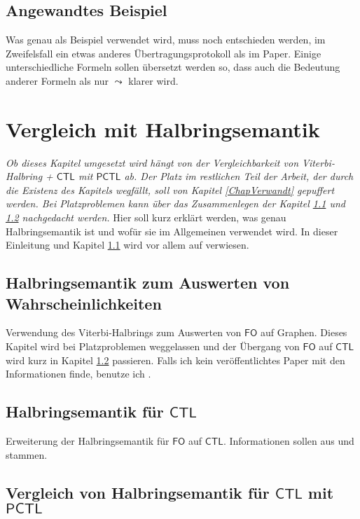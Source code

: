 \documentclass{lni}
\theoremstyle{def_style}
\theoremstyle{break}
\newcommand{\CTL}{\mathsf{CTL}}
\newcommand{\PCTL}{\mathsf{PCTL}}
\begin{document}
\subsection{Angewandtes Beispiel}

Was genau als Beispiel verwendet wird, muss noch entschieden werden, im Zweifelsfall ein etwas anderes Übertragungsprotokoll als im Paper.
Einige unterschiedliche Formeln sollen übersetzt werden so, dass auch die Bedeutung anderer Formeln als nur $\leadsto$ klarer wird.

\section{Vergleich mit Halbringsemantik}

\emph{Ob dieses Kapitel umgesetzt wird hängt von der Vergleichbarkeit von Viterbi-Halbring + $\CTL$ mit $\PCTL$ ab. Der Platz im restlichen Teil der Arbeit, der durch die Existenz des Kapitels wegfällt, soll von Kapitel \ref{ChapVerwandt} gepuffert werden. Bei Platzproblemen kann über das Zusammenlegen der Kapitel \ref{HalbringFO} und \ref{HalbringCTL} nachgedacht werden.}
Hier soll kurz erklärt werden, was genau Halbringsemantik ist und wofür sie im Allgemeinen verwendet wird. In dieser Einleitung und Kapitel \ref{HalbringFO} wird vor allem auf \cite{gradel2017semiring} verwiesen.

\subsection{Halbringsemantik zum Auswerten von Wahrscheinlichkeiten}
\label{HalbringFO}

Verwendung des Viterbi-Halbrings zum Auswerten von $\mathsf{FO}$ auf Graphen. Dieses Kapitel wird bei Platzproblemen weggelassen und der Übergang von $\mathsf{FO}$ auf $\mathsf{CTL}$ wird kurz in Kapitel \ref{HalbringCTL} passieren. Falls ich kein veröffentlichtes Paper mit den Informationen finde, benutze ich \cite{gradel2022provenance}.

\subsection{Halbringsemantik für $\CTL$}
\label{HalbringCTL}

Erweiterung der Halbringsemantik für $\mathsf{FO}$ auf $\CTL$. Informationen sollen aus \cite{dannert2019generalized} und \cite{lluch2005quantitative} stammen.

\subsection{Vergleich von Halbringsemantik für $\CTL$ mit $\PCTL$}
\end{document}
